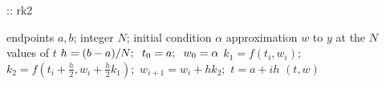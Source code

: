 \documentclass[12pt,oneside]{book}
\begin{document}
\begin{spacing}{1.2}
				\begin{algorithm}[H]
					\caption{:: \ac{rk2}}
					\begin{algorithmic}[1]
						\REQUIRE endpoints $ a, b $; \hspace*{0.2cm} integer $ N $; \hspace*{0.2cm} initial condition $ \alpha $
						\ENSURE approximation $ w $ to $ y $ at the $ N $ values of $ t $
						\STATE $ h = (b - a) / N; \hspace*{0.2cm} t_0 = a; \hspace*{0.2cm} w_{0} = \alpha $
							\STATE $ k_{1} = f(t_{i},w_{i}); $ \hspace*{0.5cm} 
							\STATE $ k_{2} = f\left(t_{i} + \frac{h}{2}, w_{i} + \frac{h}{2}k_{1}\right); $ \hspace*{0.5cm} 
							\STATE $ w_{i+1} = w_{i} + hk_{2}; $ \hspace*{0.5cm} 
							\STATE $ t = a + ih $ \hspace*{0.5cm} 
						\ENDFOR
						\RETURN $ (t, w) $
					\end{algorithmic}
				\end{algorithm}
			
		\end{spacing}
		
		\clearpage
\end{document}

